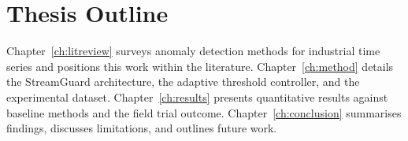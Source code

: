\section{Thesis Outline}
Chapter~\ref{ch:litreview} surveys anomaly detection methods for industrial time series and
positions this work within the literature. Chapter~\ref{ch:method} details the StreamGuard
architecture, the adaptive threshold controller, and the experimental dataset. Chapter~\ref{ch:results}
presents quantitative results against baseline methods and the field trial outcome.
Chapter~\ref{ch:conclusion} summarises findings, discusses limitations, and outlines future work.

